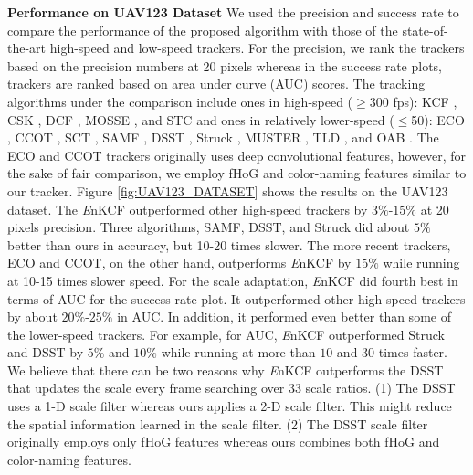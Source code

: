 \documentclass[10pt,twocolumn,letterpaper]{article}
\begin{document}
\textbf{Performance on UAV123 Dataset} We used the precision and
success rate to compare the performance of the proposed algorithm with
those of the state-of-the-art high-speed and low-speed trackers. 
For the precision, we rank the trackers based on the precision numbers 
at 20 pixels whereas in the success rate plots, trackers are ranked based 
on area under curve (AUC) scores. The
tracking algorithms under the comparison include ones in high-speed
($\geq$300 fps): KCF \cite{henriques2015high}, CSK
\cite{henriques2012exploiting}, DCF \cite{henriques2015high}, MOSSE
\cite{bolme2010visual}, and STC \cite{zhang2014fast} and ones in
relatively lower-speed ($\leq$50): ECO \cite{DanelljanCVPR2017}, CCOT
\cite{DanelljanECCV2016}, SCT \cite{Choi_2016_CVPR}, SAMF
\cite{li2014scale}, DSST \cite{danelljan2014accurate}, Struck
\cite{hare2012efficient}, MUSTER \cite{hong2015multi}, TLD
\cite{kalal2012tracking}, and OAB \cite{zhang2012robust}. The ECO and
CCOT trackers originally uses deep convolutional features, however,
for the sake of fair comparison, we employ fHoG and color-naming
features similar to our tracker. Figure \ref{fig:UAV123_DATASET} shows
the results on the UAV123 dataset. The {\it E}nKCF outperformed other
high-speed trackers by $3\%$-$15\%$ at 20 pixels precision. Three
algorithms, SAMF, DSST, and Struck did about $5\%$ better than ours in
accuracy, but 10-20 times slower. The more recent trackers, ECO and
CCOT, on the other hand, outperforms {\it E}nKCF by $15\%$ while
running at 10-15 times slower speed.  For the scale adaptation, {\it
  E}nKCF did fourth best in terms of AUC for the success rate plot. It
outperformed other high-speed trackers by about $20\%$-$25\%$ in
AUC. In addition, it performed even better than some of the
lower-speed trackers.  For example, for AUC, {\it E}nKCF outperformed
Struck and DSST by $5\%$ and $10\%$ while running at more than $10$
and $30$ times faster. We believe that there can be two reasons why {\it E}nKCF
outperforms the DSST that updates the scale every frame searching over
33 scale ratios. (1) The DSST uses a 1-D scale filter whereas ours applies a 2-D scale
filter. This might reduce the spatial information learned in the scale filter. (2) The
DSST scale filter originally employs only fHoG features whereas ours combines
both fHoG and color-naming features.
\end{document}
